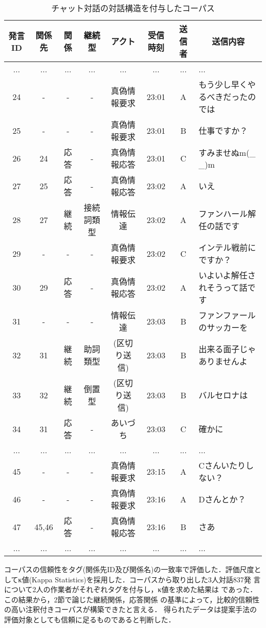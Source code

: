 \begin{table}[tbt]
  \footnotesize
  \begin{center}
    \caption{チャット対話の対話構造を付与したコーパス}
    \label{tbl:exp4.1}
    \begin{tabular}{cccccccl}
      \hline
      \hline
      発言ID & 関係先 & 関係 & 継続型 & アクト &受信時刻 & 送信者 & \multicolumn{1}{c}{送信内容} \\
      \hline
      ...&...&...&...&...&...&...&...\\
       24&-&-&-&真偽情報要求&23:01&A&もう少し早くやるべきだったのでは\\
       25&-&-&-&真偽情報要求&23:01&B&仕事ですか？\\
       26&24&応答&-&真偽情報応答&23:01&C&すみませぬm(\_ \_)m\\
       27&25&応答&-&真偽情報応答&23:02&A&いえ\\
       28&27&継続&接続詞類型&情報伝達&23:02&A&ファンハール解任の話です\\ 
       29&-&-&-&真偽情報要求&23:02&C&インテル戦前にですか？\\
       30&29&応答&-&真偽情報応答&23:02&A&いよいよ解任されそうって話です\\
       31&-&-&-&情報伝達&23:03&B&ファンファールのサッカーを\\
       32&31&継続&助詞類型&(区切り送信)&23:03&B&出来る面子じゃありませんよ\\
       33&32&継続&倒置型&(区切り送信)&23:03&B&バルセロナは\\ 
       34&31&応答&-&あいづち&23:03&C&確かに\\
      ...&...&...&...&...&...&...&...\\
       45&-&-&-&真偽情報要求&23:15&A&Cさんいたりしない？\\
       46&-&-&-&真偽情報要求&23:16&A&Dさんとか？\\
       47&45,46&応答&-&真偽情報応答&23:16&B&さあ\\
       ...&...&...&...&...&...&...&...\\
      \hline
    \end{tabular}
  \end{center}
\end{table}

コーパスの信頼性をタグ(関係先ID及び関係名)の一致率で評価した．評価尺度と
してκ値(Kappa Statistics)を採用した．コーパスから取り出した3人対話837発
言について2人の作業者がそれぞれタグを付与し，κ値を求めた結果は
であった．この結果から，2節で論じた継続関係，応答関係
の基準によって，比較的信頼性の高い注釈付きコーパスが構築できたと言える．
得られたデータは提案手法の評価対象としても信頼に足るものであると判断した．
